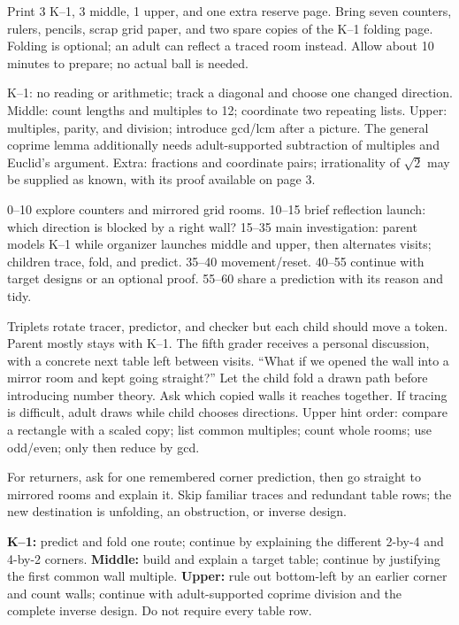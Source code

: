 \documentclass[11pt]{article}
\begin{document}
Print 3 K--1, 3 middle, 1 upper, and one extra reserve page. Bring seven counters, rulers, pencils, scrap grid paper, and two spare copies of the K--1 folding page. Folding is optional; an adult can reflect a traced room instead. Allow about 10 minutes to prepare; no actual ball is needed.

K--1: no reading or arithmetic; track a diagonal and choose one changed direction. Middle: count lengths and multiples to 12; coordinate two repeating lists. Upper: multiples, parity, and division; introduce gcd/lcm after a picture. The general coprime lemma additionally needs adult-supported subtraction of multiples and Euclid's argument. Extra: fractions and coordinate pairs; irrationality of $\sqrt2$ may be supplied as known, with its proof available on page 3.

0--10 explore counters and mirrored grid rooms. 10--15 brief reflection launch: which direction is blocked by a right wall? 15--35 main investigation: parent models K--1 while organizer launches middle and upper, then alternates visits; children trace, fold, and predict. 35--40 movement/reset. 40--55 continue with target designs or an optional proof. 55--60 share a prediction with its reason and tidy.

Triplets rotate tracer, predictor, and checker but each child should move a token. Parent mostly stays with K--1. The fifth grader receives a personal discussion, with a concrete next table left between visits.
``What if we opened the wall into a mirror room and kept going straight?'' Let the child fold a drawn path before introducing number theory. Ask which copied walls it reaches together. If tracing is difficult, adult draws while child chooses directions. Upper hint order: compare a rectangle with a scaled copy; list common multiples; count whole rooms; use odd/even; only then reduce by gcd.

For returners, ask for one remembered corner prediction, then go straight to mirrored rooms and explain it. Skip familiar traces and redundant table rows; the new destination is unfolding, an obstruction, or inverse design.

\textbf{K--1:} predict and fold one route; continue by explaining the different 2-by-4 and 4-by-2 corners. \textbf{Middle:} build and explain a target table; continue by justifying the first common wall multiple. \textbf{Upper:} rule out bottom-left by an earlier corner and count walls; continue with adult-supported coprime division and the complete inverse design. Do not require every table row.
\end{document}
